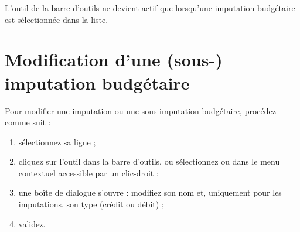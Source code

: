 L'outil \label{budgetarylines-newsub} de la barre d'outils ne devient actif que lorsqu'une imputation budgétaire est sélectionnée dans la liste.

\ifIllustration
\fi


\section{Modification d'une (sous-) imputation budgétaire\label{budgetarylines-modify}}


Pour modifier une imputation ou une sous-imputation budgétaire, procédez comme suit :

\begin{enumerate}
	\ifIllustration
	\pichskip{10mm}
	\label{budgetarylines-infos-img}
	\fi
	 \item sélectionnez sa ligne ;
	 \item cliquez sur l'outil  dans la barre d'outils, ou sélectionnez  ou  dans le menu contextuel accessible par un  clic-droit ;
	 \item une boîte de dialogue s'ouvre : modifiez son nom et, uniquement pour les imputations, son type (crédit ou débit) ;
	 \item validez.
\end{enumerate}

